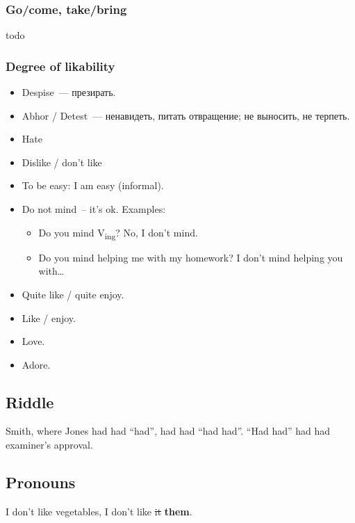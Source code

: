 \documentclass[10pt,a4paper]{article}
\begin{document}
\subsubsection{Go/come, take/bring}
todo

\subsubsection{Degree of likability}

\begin{itemize}
  \item Despise~--- презирать.
  \item Abhor / Detest~--- ненавидеть, питать отвращение; не выносить, не терпеть.
  \item Hate
  \item Dislike / don't like
  \item To be easy: I am easy (informal).
  \item Do not mind~-- it's ok. Examples:
  \begin{itemize}
    \item Do you mind V\textsubscript{ing}? No, I don't mind.
    \item Do you mind helping me with my homework? I don't mind helping you with…
  \end{itemize}
  \item Quite like / quite enjoy.
  \item Like / enjoy.
  \item Love.
  \item Adore.
\end{itemize}


\subsection{Riddle}
Smith, where Jones had had ``had'', had had ``had had''. ``Had had'' had had examiner's approval.




\subsection{Pronouns}
I don’t like vegetables, I don't like \sout{it} \textbf{them}.
\end{document}
